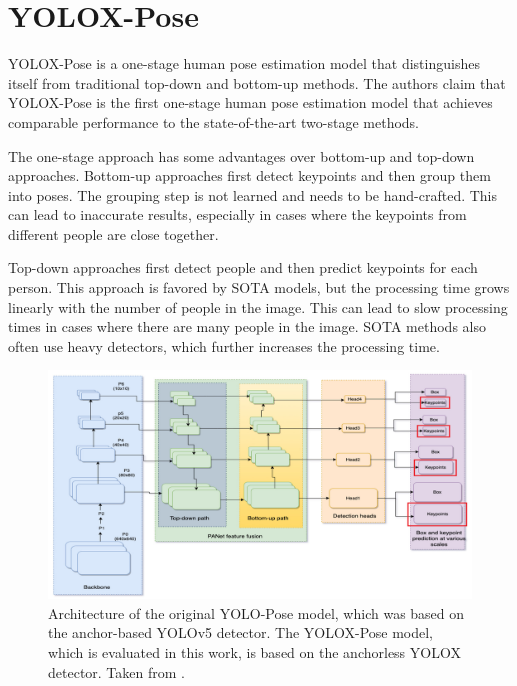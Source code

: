 \section{YOLOX-Pose}
\label{yolox-pose}

YOLOX-Pose  is a one-stage human pose estimation model that distinguishes itself from traditional top-down and bottom-up methods. The authors claim that YOLOX-Pose is the first one-stage human pose estimation model that achieves comparable performance to the state-of-the-art two-stage methods.

The one-stage approach has some advantages over bottom-up and top-down approaches. Bottom-up approaches first detect keypoints and then group them into poses. The grouping step is not learned and needs to be hand-crafted. This can lead to inaccurate results, especially in cases where the keypoints from different people are close together.

Top-down approaches first detect people and then predict keypoints for each person. This approach is favored by SOTA models, but the processing time grows linearly with the number of people in the image. This can lead to slow processing times in cases where there are many people in the image. SOTA methods also often use heavy detectors, which further increases the processing time.

\begin{figure}[htbp]
    \centering
    \includegraphics[width=\textwidth]{obrazky-figures/yolopose_architecture.png}
    \caption{Architecture of the original YOLO-Pose model, which was based on the anchor-based YOLOv5 detector. The YOLOX-Pose model, which is evaluated in this work, is based on the anchorless YOLOX detector. Taken from \cite{yoloPose}.}
    \label{fig:yolopose_architecture}
\end{figure}

